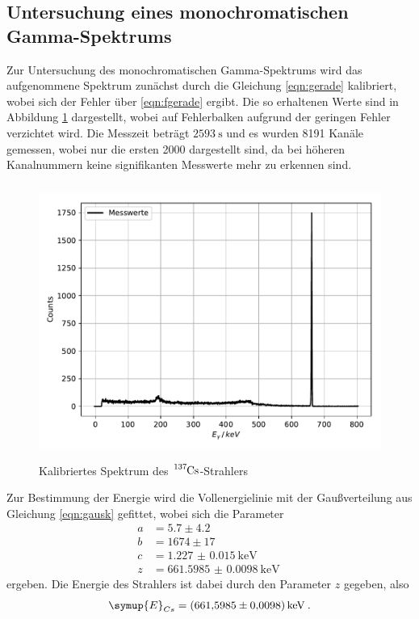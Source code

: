\subsection{Untersuchung eines monochromatischen Gamma-Spektrums}
Zur Untersuchung des monochromatischen Gamma-Spektrums wird das aufgenommene Spektrum
zunächst durch die Gleichung \ref{eqn:gerade} kalibriert, wobei sich der Fehler über
\ref{eqn:fgerade} ergibt. Die so erhaltenen Werte sind in Abbildung \ref{fig:plot5}
dargestellt, wobei auf Fehlerbalken aufgrund der geringen Fehler verzichtet wird. Die
Messzeit beträgt $\SI{2593}{\second}$ und es wurden 8191 Kanäle gemessen, wobei nur die
ersten 2000 dargestellt sind, da bei höheren Kanalnummern keine signifikanten Messwerte
mehr zu erkennen sind.
\begin{figure}
  \centering
  \includegraphics[height=9cm]{Cs.pdf}
  \caption{Kalibriertes Spektrum des $\ce{^{137}Cs}$-Strahlers }
  \label{fig:plot5}
\end{figure}
Zur Bestimmung der Energie wird die Vollenergielinie mit der Gaußverteilung aus Gleichung
\ref{eqn:gausk} gefittet, wobei sich die Parameter
\begin{align*}
  a &= 5.7 \pm 4.2 \\
  b &= 1674 \pm 17 \\
  c &= \SI{1.227(15)}{\kilo\electronvolt}\\
  z &= \SI{661.5985(98)}{\kilo\electronvolt} \:
\end{align*}
ergeben.
Die Energie des Strahlers ist dabei durch den Parameter $z$ gegeben, also
\begin{align*}
  \symup{E}_{Cs} = \SI{661.5985(98)}{\kilo\electronvolt} \: .
\end{align*}
